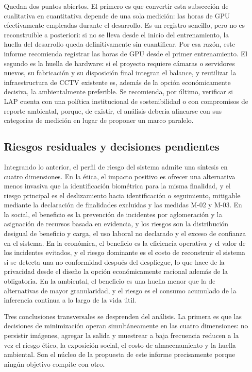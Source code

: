 Quedan dos puntos abiertos. El primero es que convertir esta subsección
de cualitativa en cuantitativa depende de una sola medición: las horas
de GPU efectivamente empleadas durante el desarrollo. Es un registro
sencillo, pero no es reconstruible a posteriori: si no se lleva desde el
inicio del entrenamiento, la huella del desarrollo queda definitivamente
sin cuantificar. Por esa razón, este informe recomienda registrar las
horas de GPU desde el primer entrenamiento. El segundo es la huella de
hardware: si el proyecto requiere cámaras o servidores nuevos, su
fabricación y su disposición final integran el balance, y reutilizar la
infraestructura de CCTV existente es, además de la opción económicamente
decisiva, la ambientalmente preferible. Se recomienda, por último,
verificar si LAP cuenta con una política institucional de sostenibilidad
o con compromisos de reporte ambiental, porque, de existir, el análisis
debería alinearse con sus categorías de medición en lugar de proponer un
marco paralelo.

\subsection{Riesgos residuales y decisiones pendientes}
\label{sec:sintesis-impacto}
\label{sec:impacto-etico}

Integrando lo anterior, el perfil de riesgo del sistema admite una
síntesis en cuatro dimensiones. En la ética, el impacto positivo es
ofrecer una alternativa menos invasiva que la identificación biométrica
para la misma finalidad, y el riesgo principal es el deslizamiento hacia
identificación o seguimiento, mitigable mediante la declaración de
finalidades excluidas y las medidas M-02 y M-03. En la social, el
beneficio es la prevención de incidentes por aglomeración y la
asignación de recursos basada en evidencia, y los riesgos son la
distribución desigual de beneficio y carga, el uso laboral no declarado
y el exceso de confianza en el sistema. En la económica, el beneficio es
la eficiencia operativa y el valor de los incidentes evitados, y el
riesgo dominante es el costo de reconstruir el sistema si se detecta una
no conformidad después del despliegue, lo que hace de la privacidad
desde el diseño la opción económicamente racional además de la
obligatoria. En la ambiental, el beneficio es una huella menor que la de
alternativas de mayor granularidad, y el riesgo es el consumo acumulado
de la inferencia continua a lo largo de la vida útil.

Tres conclusiones transversales se desprenden del análisis. La primera
es que las decisiones de minimización operan simultáneamente en las
cuatro dimensiones: no persistir imágenes, agregar la salida y muestrear
a baja frecuencia reducen a la vez el riesgo ético, la exposición
social, el costo de almacenamiento y la huella ambiental. Son el núcleo
de la propuesta de este informe precisamente porque ningún objetivo
compite con otro.

